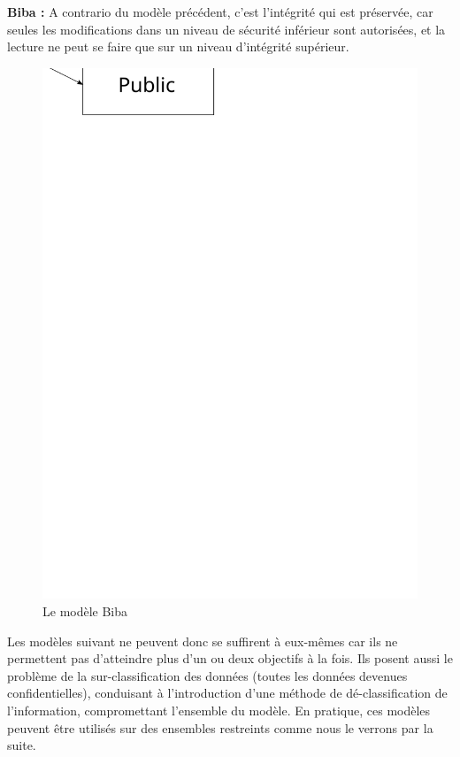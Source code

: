 \documentclass[pdftex,a4paper,titlepage,11pt]{article}
\begin{document}
\textbf{Biba :} A contrario du modèle précédent, c'est l'intégrité qui est préservée, car seules les modifications dans un niveau de sécurité inférieur sont autorisées, et la lecture ne peut se faire que sur un niveau d'intégrité supérieur.

\begin{figure}[h]
	\centering
	\includegraphics[scale=0.5]{biba}
	\caption{Le modèle Biba}
\end{figure}

Les modèles suivant ne peuvent donc se suffirent à eux-mêmes car ils ne permettent pas d'atteindre plus d'un ou deux objectifs à la fois. Ils posent aussi le problème de la sur-classification des données (toutes les données devenues confidentielles), conduisant à l'introduction d'une méthode de dé-classification de l'information, compromettant l'ensemble du modèle.
En pratique, ces modèles peuvent être utilisés sur des ensembles restreints comme nous le verrons par la suite.
\end{document}
